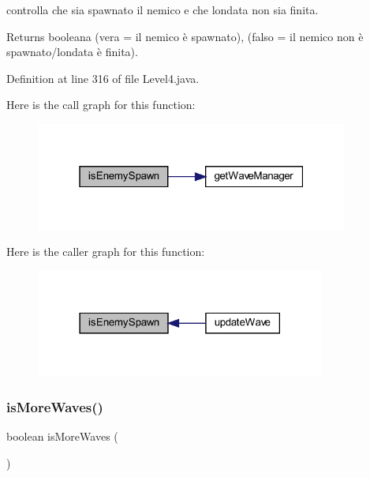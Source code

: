 controlla che sia spawnato il nemico e che l\textquotesingle{}ondata non sia finita. 

\begin{DoxyReturn}{Returns}
booleana (vera = il nemico è spawnato), (falso = il nemico non è spawnato/l\textquotesingle{}ondata è finita). 
\end{DoxyReturn}


Definition at line 316 of file Level4.\+java.

Here is the call graph for this function\+:\nopagebreak
\begin{figure}[H]
\begin{center}
\leavevmode
\includegraphics[width=292pt]{classscenes_1_1_level4_a121827ebd1c5b24c92f966721b51c0b9_cgraph}
\end{center}
\end{figure}
Here is the caller graph for this function\+:\nopagebreak
\begin{figure}[H]
\begin{center}
\leavevmode
\includegraphics[width=270pt]{classscenes_1_1_level4_a121827ebd1c5b24c92f966721b51c0b9_icgraph}
\end{center}
\end{figure}
\mbox{\label{classscenes_1_1_level4_a999f12a033f49f299ad7f55bcae24447}} 
\subsubsection{\texorpdfstring{is\+More\+Waves()}{isMoreWaves()}}
{\footnotesize\ttfamily boolean is\+More\+Waves (\begin{DoxyParamCaption}{ }\end{DoxyParamCaption})\hspace{0.3cm}{\ttfamily [private]}}



